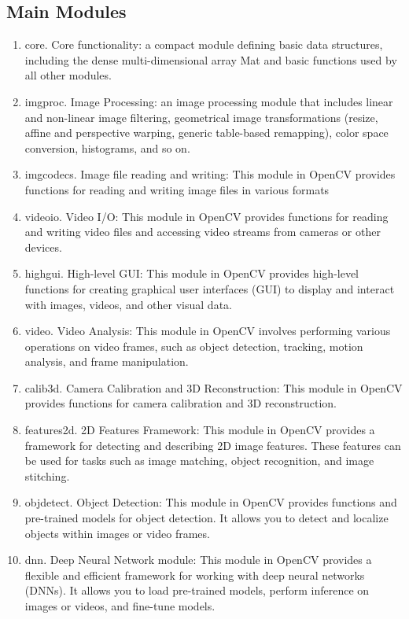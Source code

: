 \subsection{Main Modules\label{subSection::MainModules}}
\begin{enumerate}
     \item core. Core functionality: a compact module defining basic data structures, including the dense multi-dimensional array Mat and basic functions used by all other modules. 
     \item imgproc. Image Processing: an image processing module that includes linear and non-linear image filtering, geometrical image transformations (resize, affine and perspective warping, generic table-based remapping), color space conversion, histograms, and so on. 
     \item imgcodecs. Image file reading and writing: This module in OpenCV provides functions for reading and writing image files in various formats 
     \item videoio. Video I/O: This module in OpenCV provides functions for reading and writing video files and accessing video streams from cameras or other devices. 
     \item highgui. High-level GUI: This module in OpenCV provides high-level functions for creating graphical user interfaces (GUI) to display and interact with images, videos, and other visual data. 
     \item video. Video Analysis: This module in OpenCV involves performing various operations on video frames, such as object detection, tracking, motion analysis, and frame manipulation. 
     \item calib3d. Camera Calibration and 3D Reconstruction: This module in OpenCV provides functions for camera calibration and 3D reconstruction. 
     \item features2d. 2D Features Framework: This module in OpenCV provides a framework for detecting and describing 2D image features. These features can be used for tasks such as image matching, object recognition, and image stitching. 
     \item objdetect. Object Detection: This module in OpenCV provides functions and pre-trained models for object detection. It allows you to detect and localize objects within images or video frames.
     \item dnn. Deep Neural Network module: This module in OpenCV provides a flexible and efficient framework for working with deep neural networks (DNNs). It allows you to load pre-trained models, perform inference on images or videos, and fine-tune models. 

\end{enumerate}
